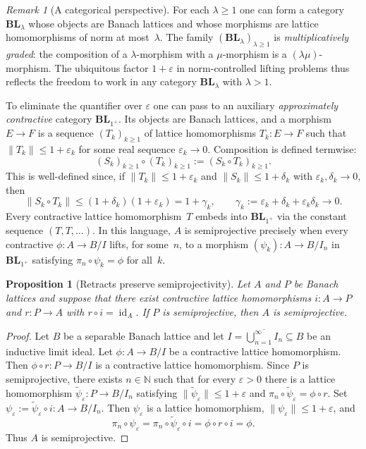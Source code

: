 \documentclass[11pt]{amsart}
\renewcommand{\le}{\leqslant}
\renewcommand{\ge}{\geqslant}
\numberwithin{equation}{section}
\newtheorem{proposition}[theorem]{Proposition}
\theoremstyle{definition}
\theoremstyle{remark}
\newtheorem{remark}[theorem]{Remark}
\theoremstyle{plain}
\DeclareMathOperator{\id}{id}
\begin{document}
\begin{remark}[A categorical perspective]\label{rem:cat}
For each $\lambda\ge 1$ one can form a category $\mathbf{BL}_\lambda$
whose objects are Banach lattices and whose morphisms are lattice homomorphisms
of norm at most~$\lambda$.
The family $(\mathbf{BL}_\lambda)_{\lambda\ge 1}$ is \emph{multiplicatively graded}:
the composition of a $\lambda$-morphism with a $\mu$-morphism is a $(\lambda\mu)$-morphism.
The ubiquitous factor $1+\varepsilon$ in norm-controlled lifting problems
thus reflects the freedom to work in any category $\mathbf{BL}_\lambda$ with $\lambda>1$.

To eliminate the quantifier over $\varepsilon$ one can pass to an auxiliary
\emph{approximately contractive} category $\mathbf{BL}_{1^+}$.
Its objects are Banach lattices, and a morphism $E\to F$ is a sequence
$(T_k)_{k\ge 1}$ of lattice homomorphisms $T_k\colon E\to F$ such that
$\|T_k\|\le 1+\varepsilon_k$ for some real sequence $\varepsilon_k\to 0$.
Composition is defined termwise:
\[
(S_k)_{k\ge 1}\circ (T_k)_{k\ge 1}:=(S_k\circ T_k)_{k\ge 1}.
\]
This is well-defined since, if $\|T_k\|\le 1+\varepsilon_k$ and
$\|S_k\|\le 1+\delta_k$ with $\varepsilon_k,\delta_k\to 0$, then
\[
\|S_k\circ T_k\|\le (1+\delta_k)(1+\varepsilon_k)=1+\gamma_k,
\qquad
\gamma_k:=\varepsilon_k+\delta_k+\varepsilon_k\delta_k\to 0.
\]
Every contractive lattice homomorphism~$T$ embeds into $\mathbf{BL}_{1^+}$
via the constant sequence $(T,T,\dots)$.
In this language, $A$ is semiprojective precisely when every contractive
$\phi\colon A\to B/I$ lifts, for some~$n$,
to a morphism $(\psi_k)\colon A\to B/I_n$ in $\mathbf{BL}_{1^+}$
satisfying $\pi_n\circ \psi_k=\phi$ for all~$k$.
\end{remark}

\begin{proposition}[Retracts preserve semiprojectivity]\label{prop:retract}
Let $A$ and $P$ be Banach lattices and suppose that there exist \emph{contractive}
lattice homomorphisms $i\colon A\to P$ and $r\colon P\to A$ with
$r\circ i=\id_A$.
If $P$ is semiprojective, then $A$ is semiprojective.
\end{proposition}

\begin{proof}
Let $B$ be a separable Banach lattice and let
$I=\overline{\bigcup_{n=1}^\infty I_n}\subseteq B$ be an inductive limit ideal.
Let $\phi\colon A\to B/I$ be a contractive lattice homomorphism.
Then $\phi\circ r\colon P\to B/I$ is a contractive lattice homomorphism.
Since $P$ is semiprojective, there exists $n\in\mathbb N$ such that for every
$\varepsilon>0$ there is a lattice homomorphism
$\widetilde\psi_\varepsilon\colon P\to B/I_n$ satisfying
$\|\widetilde\psi_\varepsilon\|\le 1+\varepsilon$ and
$\pi_n\circ \widetilde\psi_\varepsilon=\phi\circ r$.
Set $\psi_\varepsilon:=\widetilde\psi_\varepsilon\circ i\colon A\to B/I_n$.
Then $\psi_\varepsilon$ is a lattice homomorphism,
$\|\psi_\varepsilon\|\le 1+\varepsilon$, and
\[
\pi_n\circ \psi_\varepsilon
=\pi_n\circ \widetilde\psi_\varepsilon\circ i
=\phi\circ r\circ i
=\phi.
\]
Thus $A$ is semiprojective.
\end{proof}
\end{document}
